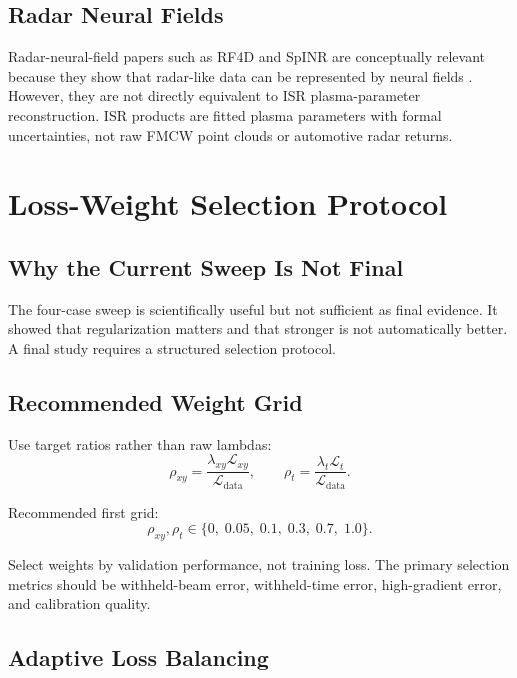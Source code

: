 \documentclass[11pt]{article}
\begin{document}
\subsection{Radar Neural Fields}

Radar-neural-field papers such as RF4D and SpINR are conceptually relevant because they show
that radar-like data can be represented by neural fields \cite{RF4D2024,SpINR2024}. However,
they are not directly equivalent to ISR plasma-parameter reconstruction. ISR products are fitted
plasma parameters with formal uncertainties, not raw FMCW point clouds or automotive radar
returns.

\section{Loss-Weight Selection Protocol}

\subsection{Why the Current Sweep Is Not Final}

The four-case sweep is scientifically useful but not sufficient as final evidence. It showed that
regularization matters and that stronger is not automatically better. A final study requires a
structured selection protocol.

\subsection{Recommended Weight Grid}

Use target ratios rather than raw lambdas:
\begin{equation}
  \rho_{xy}
  =
  \frac{\lambda_{xy}\mathcal{L}_{xy}}
  {\mathcal{L}_{\mathrm{data}}},
  \qquad
  \rho_t
  =
  \frac{\lambda_t\mathcal{L}_t}
  {\mathcal{L}_{\mathrm{data}}}.
\end{equation}

Recommended first grid:
\begin{equation}
  \rho_{xy},\rho_t \in
  \{0,\;0.05,\;0.1,\;0.3,\;0.7,\;1.0\}.
\end{equation}

Select weights by validation performance, not training loss. The primary selection metrics should
be withheld-beam error, withheld-time error, high-gradient error, and calibration quality.

\subsection{Adaptive Loss Balancing}
\end{document}
